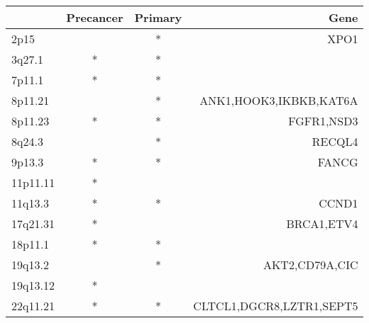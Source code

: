 \begin{tabular}{lccr}
\toprule
{} & Precancer & Primary &                      Gene \\
\midrule
2p15     &           &       * &                      XPO1 \\
3q27.1   &         * &       * &                           \\
7p11.1   &         * &       * &                           \\
8p11.21  &           &       * &    ANK1,HOOK3,IKBKB,KAT6A \\
8p11.23  &         * &       * &                FGFR1,NSD3 \\
8q24.3   &           &       * &                    RECQL4 \\
9p13.3   &         * &       * &                     FANCG \\
11p11.11 &         * &         &                           \\
11q13.3  &         * &       * &                     CCND1 \\
17q21.31 &         * &         &                BRCA1,ETV4 \\
18p11.1  &         * &       * &                           \\
19q13.2  &           &       * &            AKT2,CD79A,CIC \\
19q13.12 &         * &         &                           \\
22q11.21 &         * &       * &  CLTCL1,DGCR8,LZTR1,SEPT5 \\
\bottomrule
\end{tabular}
